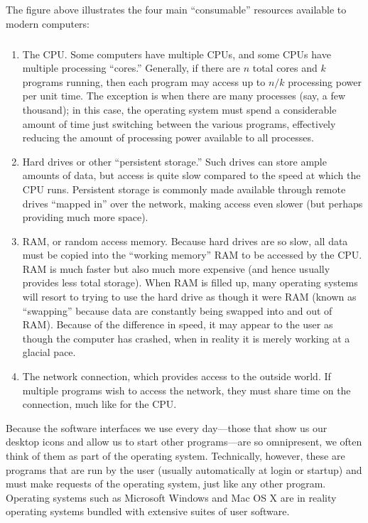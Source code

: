 \documentclass[
]{memoir}
\providecommand{\tightlist}{%
  \setlength{\itemsep}{0pt}\setlength{\parskip}{0pt}}
\begin{document}
The figure above illustrates the four main \enquote{consumable} resources available to modern computers:

\hypertarget{hardware_defs}{%
\subparagraph{}\label{hardware_defs}}

\begin{enumerate}
\def\labelenumi{\arabic{enumi}.}
\tightlist
\item
  The CPU. Some computers have multiple CPUs, and some CPUs have multiple processing \enquote{cores.} Generally, if there are \(n\) total cores and \(k\) programs running, then each program may access up to \(n/k\) processing power per unit time. The exception is when there are many processes (say, a few thousand); in this case, the operating system must spend a considerable amount of time just switching between the various programs, effectively reducing the amount of processing power available to all processes.
\item
  Hard drives or other \enquote{persistent storage.} Such drives can store ample amounts of data, but access is quite slow compared to the speed at which the CPU runs. Persistent storage is commonly made available through remote drives \enquote{mapped in} over the network, making access even slower (but perhaps providing much more space).
\item
  RAM, or random access memory. Because hard drives are so slow, all data must be copied into the \enquote{working memory} RAM to be accessed by the CPU. RAM is much faster but also much more expensive (and hence usually provides less total storage). When RAM is filled up, many operating systems will resort to trying to use the hard drive as though it were RAM (known as \enquote{swapping} because data are constantly being swapped into and out of RAM). Because of the difference in speed, it may appear to the user as though the computer has crashed, when in reality it is merely working at a glacial pace.
\item
  The network connection, which provides access to the outside world. If multiple programs wish to access the network, they must share time on the connection, much like for the CPU.
\end{enumerate}

Because the software interfaces we use every day---those that show us our desktop icons and allow us to start other programs---are so omnipresent, we often think of them as part of the operating system. Technically, however, these are programs that are run by the user (usually automatically at login or startup) and must make requests of the operating system, just like any other program. Operating systems such as Microsoft Windows and Mac OS X are in reality operating systems bundled with extensive suites of user software.
\end{document}
